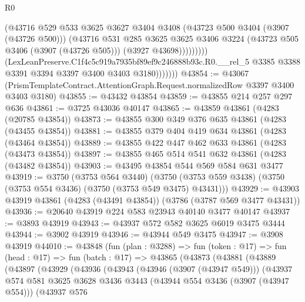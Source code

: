 \begin{lexlean}{R0}
\begin{coremodule}
                            (@43716
                              @529
                              @533
                              @3625
                              @3627
                              @3404
                              @3408
                              (@43723 @500 @3404 (@3907 (@43726 @500)))
                              (@43716
                                @531
                                @285
                                @3625
                                @3625
                                @3406
                                @3224
                                (@43723 @505 @3406 (@3907 (@43726 @505)))
                                (@3927 @43698)))))))))
                (LexLeanPreserve.C1f4c5c919a7935bf89ef9c246888b93c.R0.__rel_5
                  @3385
                  @3388
                  @3391
                  @3394
                  @3397
                  @3400
                  @3403
                  @3180)))))))
@43854 := @43067
    (PrismTemplateContract.AttentionGraph.Request.normalizedRow @3397 @3400 @3403 @3180)
@43855 := @43432 @43854
@43859 := @43855 @214 @257 @297 @636
@43861 := @3725 @43036 @40147
@43865 := @43859 @43861 (@4283 (@20785 @43854))
@43873 := @43855 @300 @349 @376 @635 @43861 (@4283 (@43455 @43854))
@43881 := @43855 @379 @404 @419 @634 @43861 (@4283 (@43464 @43854))
@43889 := @43855 @422 @447 @462 @633 @43861 (@4283 (@43473 @43854))
@43897 := @43855 @465 @514 @541 @632 @43861 (@4283 (@43482 @43854))
@43903 := @43495 @43854 @544 @569 @584 @631 @3477
@43919 := @3750
    (@3753 @564 @3440)
    (@3750 (@3753 @559 @3438) (@3750 (@3753 @554 @3436) (@3750 (@3753 @549 @3475) @43431)))
@43929 := @43903 @43919 @43861 (@4283 (@43491 @43854)) (@3786 (@3787 @569 @3477 @43431))
@43936 := @20640 @43919 @224 @583 @23943 @40140 @3477 @40147
@43937 := @3893 @43919
@43943 := @43937 @572 @582 @3625 @6019 @3475 @3444
@43944 := @3902 @43919
@43946 := @43944 @549 @3475
@43947 := @3908 @43919
@44010 := @43848
    (fun (plan : @3288) =>
    fun (token : @17) =>
    fun (head : @17) =>
    fun (batch : @17) =>
    @43865
      (@43873
        (@43881
          (@43889
            (@43897
              (@43929
                (@43936
                  (@43943
                    (@43946 (@3907 (@43947 @549)))
                    (@43937
                      @574
                      @581
                      @3625
                      @3628
                      @3436
                      @3443
                      (@43944 @554 @3436 (@3907 (@43947 @554)))
                      (@43937
                        @576

\end{coremodule}
\end{lexlean}
